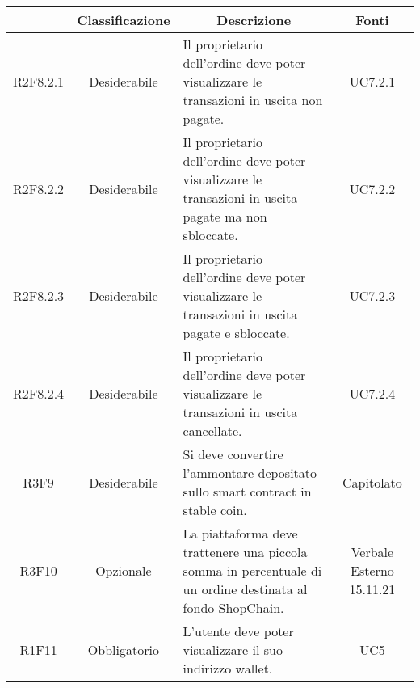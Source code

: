 \begin{table}[H]
    \centering
    \renewcommand{\arraystretch}{1.8}
    \begin{tabular}{c | c | p{6cm} | c}
        \rowcolor[HTML]{125E28}
        \multicolumn{1}{c}{\color[HTML]{FFFFFF} \textbf{Codice}}          &
        \multicolumn{1}{c}{\color[HTML]{FFFFFF} \textbf{Classificazione}} &
        \multicolumn{1}{c}{\color[HTML]{FFFFFF} \textbf{Descrizione}}     &
        \multicolumn{1}{c}{\color[HTML]{FFFFFF} \textbf{Fonti}}                                                                                                                                                                  \\
        \hline
        R2F8.2.1                                                          & Desiderabile & Il proprietario dell'ordine deve poter visualizzare le transazioni in uscita non pagate.                   & UC7.2.1                  \\
        R2F8.2.2                                                          & Desiderabile & Il proprietario dell'ordine deve poter visualizzare le transazioni in uscita pagate ma non sbloccate.      & UC7.2.2                  \\
        R2F8.2.3                                                          & Desiderabile & Il proprietario dell'ordine deve poter visualizzare le transazioni in uscita pagate e sbloccate.           & UC7.2.3                  \\
        R2F8.2.4                                                          & Desiderabile & Il proprietario dell'ordine deve poter visualizzare le transazioni in uscita cancellate.                   & UC7.2.4                  \\
        R3F9                                                              & Desiderabile & Si deve convertire l'ammontare depositato sullo smart contract\glo{} in stable coin\glo{}.                 & Capitolato               \\
        R3F10                                                             & Opzionale    & La piattaforma deve trattenere una piccola somma in percentuale di un ordine destinata al fondo ShopChain. & Verbale Esterno 15.11.21 \\
        R1F11                                                             & Obbligatorio & L'utente deve poter visualizzare il suo indirizzo wallet\glo{}.                                                  & UC5                      \\

\end{tabular}
\end{table}
